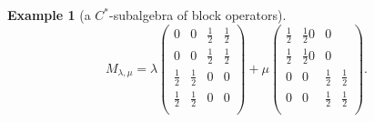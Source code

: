 \documentclass[12pt,a4paper]{article}
\newtheorem{example}{Example}
\numberwithin{equation}{section}
\begin{document}
\begin{example}[a $C^*$-subalgebra of block operators]
	\[M_{\lambda,\mu}=\lambda\begin{pmatrix}
		0&0&\frac 12&\frac 12\\
		0&0&\frac 12&\frac 12\\
		\frac 12&\frac 12&0&0\\
		\frac 12&\frac 12&0&0\\
	\end{pmatrix}+\mu \begin{pmatrix}
	\frac 12&\frac 120&0&\\
	\frac 12&\frac 120&0&\\
	0&0&\frac 12&\frac 12\\
	0&0&\frac 12&\frac 12\\
	\end{pmatrix}.\]
\end{example}
\end{document}

